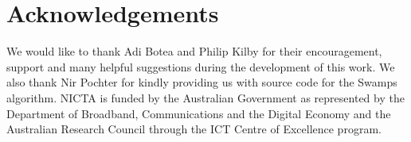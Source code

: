 \section{Acknowledgements}
We would like to thank Adi Botea and Philip Kilby for their encouragement,
support and many helpful suggestions during the development of this work.
We also thank Nir Pochter for kindly providing us with source code for the
Swamps algorithm.
NICTA is funded by the Australian Government as represented by the Department of 
Broadband, Communications and the Digital Economy and the Australian Research 
Council through the ICT Centre of Excellence program.
